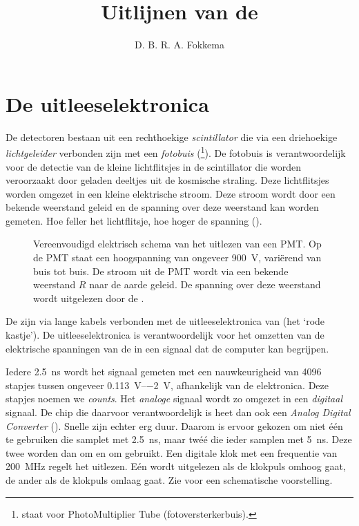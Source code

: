 

\title{Uitlijnen van de \adcs}
\author{D. B. R. A. Fokkema}



\maketitle

\section{De \hisparc uitleeselektronica}

De \hisparc detectoren bestaan uit een rechthoekige \emph{scintillator}
die via een driehoekige \emph{lichtgeleider} verbonden zijn met een
\emph{fotobuis} (\pmt \footnote{\pmt staat voor PhotoMultiplier Tube
(fotoversterkerbuis).}).  De fotobuis is verantwoordelijk voor de detectie
van de kleine lichtflitsjes in de scintillator die worden veroorzaakt door
geladen deeltjes uit de kosmische straling.  Deze lichtflitsjes worden
omgezet in een kleine elektrische stroom.  Deze stroom wordt door een
bekende weerstand geleid en de spanning over deze weerstand kan worden
gemeten.  Hoe feller het lichtflitsje, hoe hoger de spanning
().

\begin{figure}
\centering

\caption{Vereenvoudigd elektrisch schema van het uitlezen van een PMT.  Op
de PMT staat een hoogspanning van ongeveer \SI{900}{\volt}, variërend van
buis tot buis.  De stroom uit de PMT wordt via een bekende weerstand $R$
naar de aarde geleid.  De spanning over deze weerstand wordt uitgelezen
door de \adcs.}
\label{fig:schema-pmt}
\end{figure}

De \pmts zijn via lange kabels verbonden met de uitleeselektronica van
\hisparc (het `rode kastje').  De uitleeselektronica is verantwoordelijk
voor het omzetten van de elektrische spanningen van de \pmts in een
signaal dat de computer kan begrijpen.

Iedere \SI{2.5}{\nano\second} wordt het signaal gemeten met een
nauwkeurigheid van \num{4096} stapjes tussen ongeveer
\SIrange{+0.113}{-2}{\volt}, afhankelijk van de elektronica.  Deze stapjes
noemen we \emph{\adc counts}.  Het \emph{analoge} signaal wordt zo omgezet
in een \emph{digitaal} signaal.  De chip die daarvoor verantwoordelijk is
heet dan ook een \emph{Analog Digital Converter} (\adc).  Snelle \adcs
zijn echter erg duur.  Daarom is ervoor gekozen om niet één \adc te
gebruiken die samplet met \SI{2.5}{\nano\second}, maar twéé \adcs die
ieder samplen met \SI{5}{\nano\second}.  Deze twee \adcs worden dan om en
om gebruikt.  Een digitale klok met een frequentie van
\SI{200}{\mega\hertz} regelt het uitlezen.  Eén \adc wordt uitgelezen als
de klokpuls omhoog gaat, de ander als de klokpuls omlaag gaat.  Zie
 voor een schematische voorstelling.

